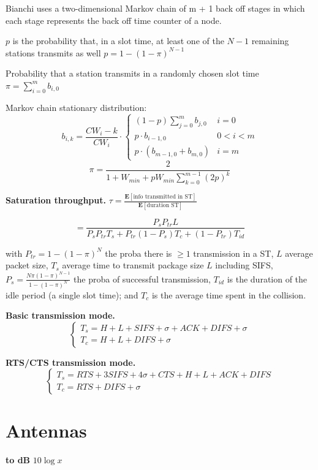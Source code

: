 \documentclass[10pt,twocolumn]{article}
\newcommand{\E}[1]{\mathbf{E}\l[#1\r]}
\renewcommand{\l}{\left}
\renewcommand{\r}{\right}
\renewcommand{\bf}{\textbf}
\begin{document}

Bianchi uses a two-dimensional Markov chain of m + 1 back off stages in which each stage represents the back off time counter of a node. 

$p$ is the probability that, in a slot time, at least one of the $N-1$ remaining stations transmits as well $p=1-(1-\pi)^{N-1}$

Probability that a station transmits in a randomly chosen slot time $\pi = \sum_{i=0}^m b_{i,0}$

Markov chain stationary distribution:
\[
  b_{i,k} = \frac{CW_i - k}{CW_i} \cdot \begin{cases}
    (1-p) \sum_{j=0}^m b_{j,0} & i = 0\\
    p \cdot b_{i-1,0} & 0 < i < m \\
    p\cdot(b_{m-1,0}+b_{m,0}) & i = m
  \end{cases}
\]
\[
  \pi = \frac 2 {1+W_{min} + p W_{min} \sum_{k=0}^{m-1}(2p)^k}
\]


\bf{Saturation throughput.} 
$
  \tau = \frac{\E{\text{info transmitted in ST}}}{\E{\text{duration ST}}}$

\[= \frac {P_s P_{tr} L} {P_s P_{tr}T_s + P_{tr}(1-P_s)T_c + (1-P_{tr})T_{id}}\]

with $P_{tr} = 1 - (1-\pi)^N$ the proba there is $\geq 1$ transmission in a ST, $L$ average packet size, $T_s$ average time to transmit package size $L$ including SIFS, $P_s = \frac{N\pi(1-\pi)^{N-1}}{1-(1-\pi)^N}$ the proba of successful transmission, $T_{id}$ is the duration of the idle period (a single slot time); and $T_c$ is the average time spent in the collision.

\bf{Basic transmission mode.}
\[
  \begin{cases}
    T_s = H+L+SIFS+\sigma+ACK+DIFS+\sigma\\
    T_c = H + L + DIFS + \sigma
  \end{cases}
\]

\bf{RTS/CTS transmission mode.}
\[
  \begin{cases}
    T_s = RTS+3SIFS+4\sigma+CTS+H+L+ACK+DIFS\\
    T_c = RTS + DIFS + \sigma
  \end{cases}
\]

\section{Antennas}

\bf{to dB} $10 \log x$
\end{document}
